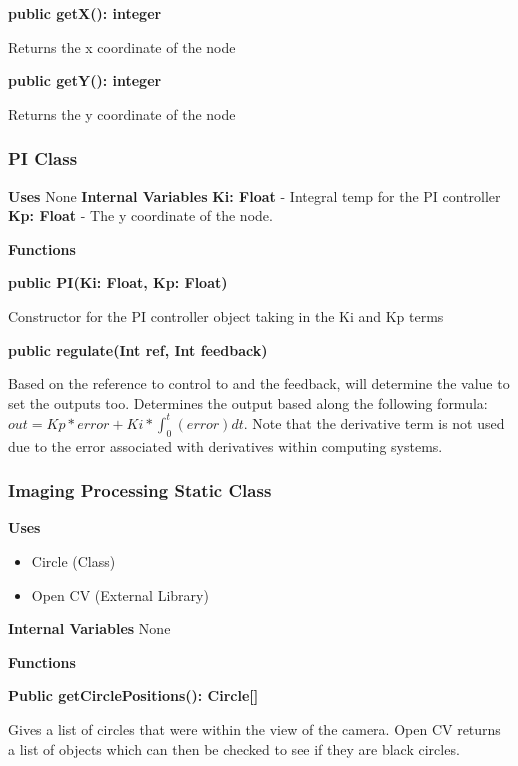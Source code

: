 \documentclass [10pt]{article}
\begin{document}
\textbf{public getX(): integer}

Returns the x coordinate of the node

\textbf{public getY(): integer}

Returns the y coordinate of the node


\subsubsection{PI Class}
\textbf{Uses}
None 
\textbf{Internal Variables}
\textbf{Ki: Float} - Integral temp for the PI controller
\textbf{Kp: Float} - The y coordinate of the node.

\textbf{Functions}

\textbf{public PI(Ki: Float, Kp: Float)}

Constructor for the PI controller object taking in the Ki and Kp terms

\textbf{public regulate(Int ref, Int feedback)}

Based on the reference to control to and the feedback, will determine the value to set the outputs too. Determines the output based along the following formula: $ out = Kp*error+Ki*\int_{0}^{t}(error)dt$. Note that the derivative term is not used due to the error associated with derivatives within computing systems.


\subsubsection{Imaging Processing Static Class}

\textbf{Uses}
\begin{itemize}
	\item Circle (Class)
	\item Open CV (External Library)
\end{itemize}

\textbf{Internal Variables}
None

\textbf{Functions}

\textbf{Public getCirclePositions(): Circle[]}

Gives a list of circles that were within the view of the camera. Open CV returns a list of objects which can then be checked to see if they are black circles.

\end{document}
